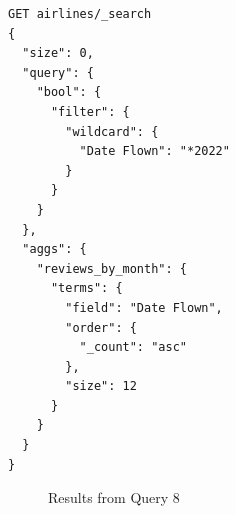 \documentclass{Configuration_Files/PoliMi3i_thesis}
\begin{document}
\begin{enumerate}
    \begin{verbatim}
GET airlines/_search
{
  "size": 0,
  "query": {
    "bool": {
      "filter": {
        "wildcard": {
          "Date Flown": "*2022"
        }
      }
    }
  },
  "aggs": {
    "reviews_by_month": {
      "terms": {
        "field": "Date Flown",
        "order": {
          "_count": "asc"
        },
        "size": 12
      }
    }
  }
}
    \end{verbatim}

\begin{figure}[H]
    \centering
    \quad
        \caption{Results from Query 8}


\end{figure}
\end{enumerate}
\end{document}

